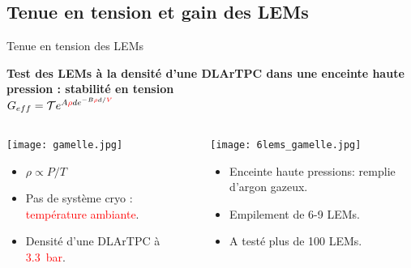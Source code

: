     \subsection[Tension et gain]{Tenue en tension et gain des LEMs}

    \begin{frame}{Tenue en tension des LEMs}
    	\begin{scriptsize}
    		\begin{center}
    			\textbf{Test des LEMs à la densité d'une DLArTPC dans une enceinte haute pression : stabilité en tension}\\
    			$G _{eff}= \mathcal{T}e^{A\textcolor{red}{\rho} d e^{-B\textcolor{red}{\rho}d/\textcolor{red}{V}}}$
    		\end{center} 
    		\begin{columns}
		    	\begin{column}{0.5\textwidth}
		    		\texttt{[image: gamelle.jpg]}\\
		    		\begin{itemize}
		    			\item $\rho \propto P/T$
		    			\item Pas de système cryo : \textcolor{red}{température ambiante}.
		    			\item Densité d'une DLArTPC à \textcolor{red}{\SI{3.3}{\bar}}.
		    		\end{itemize}
		    	\end{column}\hfill
		    	\begin{column}{0.5\textwidth}
		    		\texttt{[image: 6lems\_gamelle.jpg]}\\
		    		\begin{itemize}
		    			\item Enceinte haute pressions: remplie d'argon gazeux.
		    			\item Empilement de 6-9 LEMs.
		    			\item A testé plus de 100 LEMs.
		    		\end{itemize}
		    	\end{column}
		    \end{columns}
	    \end{scriptsize} 
    \end{frame}

